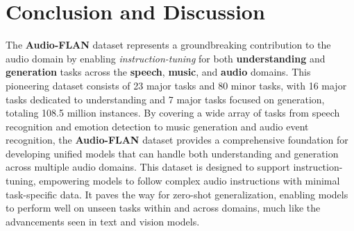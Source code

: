 \section{Conclusion and Discussion}


 The \textbf{Audio-FLAN} dataset represents a groundbreaking contribution to the audio domain by enabling \textit{instruction-tuning} for both \textbf{understanding} and \textbf{generation} tasks across the \textbf{speech}, \textbf{music}, and \textbf{audio} domains. This pioneering dataset consists of 23 major tasks and 80 minor tasks, with 16 major tasks dedicated to understanding and 7 major tasks focused on generation, totaling 108.5 million instances. By covering a wide array of tasks from speech recognition and emotion detection to music generation and audio event recognition, the \textbf{Audio-FLAN} dataset provides a comprehensive foundation for developing unified models that can handle both understanding and generation across multiple audio domains. This dataset is designed to support instruction-tuning, empowering models to follow complex audio instructions with minimal task-specific data. It paves the way for zero-shot generalization, enabling models to perform well on unseen tasks within and across domains, much like the advancements seen in text and vision models.


